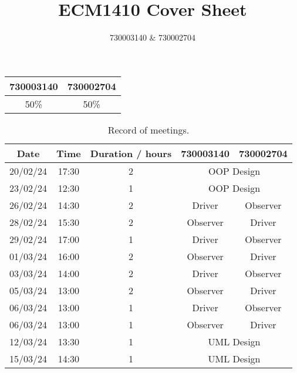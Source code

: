 \documentclass{article}
\title{ECM1410 Cover Sheet}
\author{730003140 \& 730002704}
\begin{document}
\maketitle

\newpage

\begin{table}
    \centering
    \begin{tabular}{cc}
        \toprule
        \textbf{730003140} & \textbf{730002704} \\
        \midrule
        50\% & 50\% \\
        \bottomrule
    \end{tabular}
\end{table}

\begin{table}
    \centering
    \begin{tabular}{ccccc}
        \toprule
        \textbf{Date} & \textbf{Time} & \textbf{Duration / hours} & \textbf{730003140}             & \textbf{730002704} \\
        \midrule
        20/02/24      & 17:30         & 2                         & \multicolumn{2}{c}{OOP Design}                      \\
        23/02/24      & 12:30         & 1                         & \multicolumn{2}{c}{OOP Design}                      \\
        26/02/24      & 14:30         & 2                         & Driver                         & Observer           \\
        28/02/24      & 15:30         & 2                         & Observer                       & Driver             \\
        29/02/24      & 17:00         & 1                         & Driver                         & Observer           \\
        01/03/24      & 16:00         & 2                         & Observer                       & Driver             \\
        03/03/24      & 14:00         & 2                         & Driver                         & Observer           \\
        05/03/24      & 13:00         & 2                         & Observer                       & Driver             \\
        06/03/24      & 13:00         & 1                         & Driver                         & Observer           \\
        06/03/24      & 13:00         & 1                         & Observer                       & Driver             \\
        12/03/24      & 13:30         & 1                         & \multicolumn{2}{c}{UML Design}                      \\
        15/03/24      & 14:30         & 1                         & \multicolumn{2}{c}{UML Design}                      \\
        \bottomrule
    \end{tabular}
    \caption{Record of meetings.}
\end{table}
\end{document}
